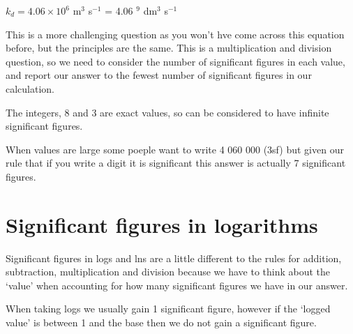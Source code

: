\documentclass[
  letterpaper,
  DIV=11,
  numbers=noendperiod]{scrreprt}
\newcounter{quartocallouttipno}
\newcommand{\quartocallouttip}[1]{\refstepcounter{quartocallouttipno}\label{#1}}
\begin{document}
\begin{tcolorbox}[enhanced jigsaw, arc=.35mm, bottomrule=.15mm, bottomtitle=1mm, breakable, colback=white, colbacktitle=quarto-callout-note-color!10!white, colframe=quarto-callout-note-color-frame, coltitle=black, left=2mm, leftrule=.75mm, opacityback=0, opacitybacktitle=0.6, rightrule=.15mm, title=\textcolor{quarto-callout-note-color}{\faInfo}\hspace{0.5em}{Determine the rate constant of diffusion, \(k_d\) at 278 K, if the
viscosity of the medium, \(\eta\), is 1.518 mPa s, given \$k\_d =
\frac{8RT}{3\eta}.}, titlerule=0mm, toprule=.15mm, toptitle=1mm]

\(k_d = 4.06 \times 10^{6}\) m\(^3\) s\(^{-1}\) = 4.06 \(^{9}\)
dm\(^3\) s\(^{-1}\)

This is a more challenging question as you won't hve come across this
equation before, but the principles are the same. This is a
multiplication and division question, so we need to consider the number
of significant figures in each value, and report our answer to the
fewest number of significant figures in our calculation.

The integers, 8 and 3 are exact values, so can be considered to have
infinite significant figures.

When values are large some poeple want to write 4 060 000 (3sf) but
given our rule that if you write a digit it is significant this answer
is actually 7 significant figures.

\end{tcolorbox}

\section{Significant figures in logarithms}\label{sec-sflog}

Significant figures in logs and lns are a little different to the rules
for addition, subtraction, multiplication and division because we have
to think about the `value' when accounting for how many significant
figures we have in our answer.

\begin{tcolorbox}[enhanced jigsaw, arc=.35mm, bottomrule=.15mm, bottomtitle=1mm, breakable, colback=white, colbacktitle=quarto-callout-tip-color!10!white, colframe=quarto-callout-tip-color-frame, coltitle=black, left=2mm, leftrule=.75mm, opacityback=0, opacitybacktitle=0.6, rightrule=.15mm, title=\textcolor{quarto-callout-tip-color}{\faLightbulb}\hspace{0.5em}{Tip \ref*{tip-scales}: Significant figures in logs and lns.}, titlerule=0mm, toprule=.15mm, toptitle=1mm]

\quartocallouttip{tip-scales} 

When taking logs we usually gain 1 significant figure, however if the
`logged value' is between 1 and the base then we do not gain a
significant figure.

\end{tcolorbox}
\end{document}
